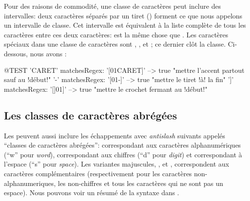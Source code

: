\documentclass[a4paper,10pt,twoside]{book}
\begin{document}
Pour des raisons de commodité, une classe de caractères peut inclure
des intervalles: deux caractères séparés par un tiret (\ct{-})
forment ce que nous appelons un intervalle de classe.
Cet intervalle est équivalent à la liste complète de tous les
caractères entre ces deux caractères:   est la même chose
que  .
Les caractères spéciaux dans une classe de caractères sont 
, \ct{-}, et \ct{]}; ce dernier clôt la classe. 
Ci-dessous, nous avons :
\begin{code}{@TEST}
'CARET' matchesRegex: '[01CARET]'   --> true    "mettre l'accent partout sauf au !début!"
'-' matchesRegex: '[01-]' --> true    "mettre le tiret !à! la fin"
']' matchesRegex: '[]01]'   --> true    "mettre le crochet fermant au
!début!"
\end{code}

\noindent{} 

\subsection{Les classes de caractères abrégées}
Les \expregs{} peuvent aussi inclure les échappements avec
\emph{antislash} suivants appelés ``classes de caractères abrégées'':
\ct{\w} correspondant aux caractères alphanumériques (``w'' pour
\emph{word}), \ct{\d} correspondant aux chiffres (``d'' pour
\emph{digit}) et \ct{\s} correspondant à l'espace (``s'' pour
\emph{space}).
Les variantes majuscules, \ct{\W}, \ct{\D} et \ct{\S}, correspondent
aux caractères complémentaires (respectivement pour les caractères
non-alphanumeriques, les non-chiffres et tous les caractères qui ne
sont pas un espace).
Nous pouvons voir un résumé de la syntaxe \pkgregex dans
.
\end{document}
